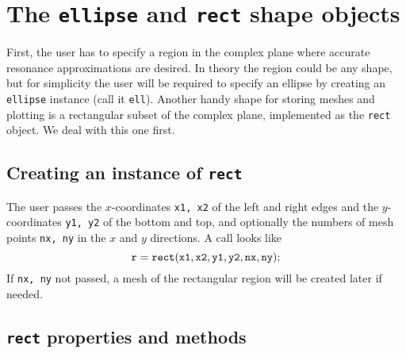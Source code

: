 \section{The {\tt ellipse} and {\tt rect} shape objects}
\label{sec-ellipse}

First, the user has to specify a region in the complex plane
where accurate
resonance approximations are desired. In theory the
region could be any shape, but for simplicity the user
will be required to specify an ellipse by creating
an {\tt ellipse} instance (call it {\tt ell}). Another handy
shape for storing meshes and plotting is a rectangular 
subset of the complex plane,
implemented as the {\tt rect} object. We deal with this 
one first.

\subsection{Creating an instance of {\tt rect}}

The user passes the $x$-coordinates {\tt x1, x2} 
of the left and right
edges and the $y$-coordinates {\tt y1, y2} of the
bottom and top, and optionally the numbers of mesh points 
{\tt nx, ny} in
the $x$ and $y$ directions. A call looks like
\begin{equation}
 {\tt r = rect(x1,x2,y1,y2,nx,ny);}
\end{equation}
If {\tt nx, ny} not passed, a mesh of the rectangular
region will be created later if needed.

\subsection{{\tt rect} properties and methods}

